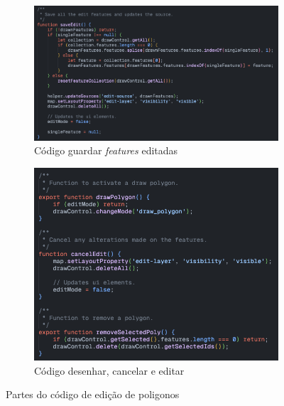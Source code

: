\begin{figure}[!h]
	\centering
	\begin{subfigure}[c]{0.52\textwidth}
		\centering
		\includegraphics[width=\textwidth]{figs/saveEditFeatures.png}
		\caption{Código guardar \textit{features} editadas}
		\label{fig:saveEditFeature}
	\end{subfigure}
	\hfill
	\begin{subfigure}[c]{0.38\textwidth}
		\centering
		\includegraphics[width=\textwidth]{figs/drawCancelRemove.png}
		\caption{Código desenhar, cancelar e editar}
		\label{fig:drawCancelEdit}
	\end{subfigure}
	\caption{Partes do código de edição de poligonos}
    \label{fig:codeEditPoly}
\end{figure}




